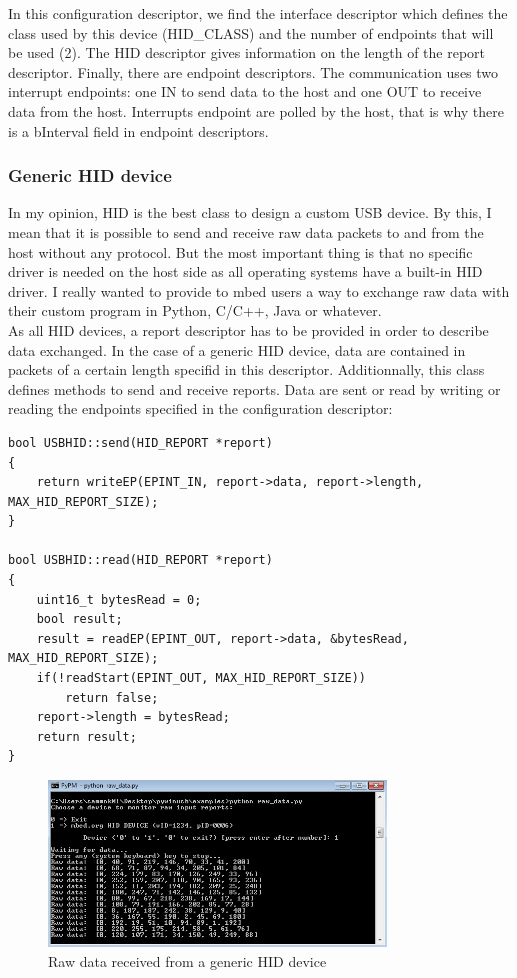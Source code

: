 \documentclass[pdftex,10pt,a4paper]{report}
\begin{document}
In this configuration descriptor, we find the interface descriptor which defines the class used by this device (HID\_CLASS) and the number of endpoints that will be used (2). The HID descriptor gives information on the length of the report descriptor. Finally, there are endpoint descriptors. The communication uses two interrupt endpoints: one IN to send data to the host and one OUT to receive data from the host. Interrupts endpoint are polled by the host, that is why there is a bInterval field in endpoint descriptors.


\subsubsection{Generic HID device}
In my opinion, HID is the best class to design a custom USB device. By this, I mean that it is possible to send and receive raw data packets to and from the host without any protocol. But the most important thing is that no specific driver is needed on the host side as all operating systems have a built-in HID driver. I really wanted to provide to mbed users a way to exchange raw data with their custom program in Python, C/C++, Java or whatever. \\

As all HID devices, a report descriptor has to be provided in order to describe data exchanged. In the case of a generic HID device, data are contained in packets of a certain length specifid in this descriptor. Additionnally, this class defines methods to send and receive reports. Data are sent or read by writing or reading the endpoints specified in the configuration descriptor:

\begin{lstlisting}[label=Send and receive HID reports,caption=Send and receive HID reports]
bool USBHID::send(HID_REPORT *report)
{
    return writeEP(EPINT_IN, report->data, report->length, MAX_HID_REPORT_SIZE);
}

bool USBHID::read(HID_REPORT *report)
{
    uint16_t bytesRead = 0;
    bool result;
    result = readEP(EPINT_OUT, report->data, &bytesRead, MAX_HID_REPORT_SIZE);
    if(!readStart(EPINT_OUT, MAX_HID_REPORT_SIZE))
        return false;
    report->length = bytesRead;
    return result;
}
\end{lstlisting}

\begin{figure}[h!]
		\centering
		\includegraphics[width=0.8\textwidth]{./hid_py_raw_data.jpg}
		\caption{Raw data received from a generic HID device}
		\label{Raw data received from a generic HID device}
\end{figure}
\end{document}
